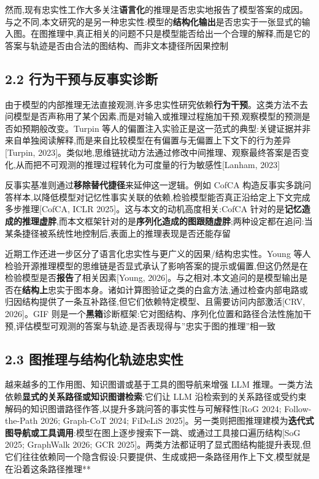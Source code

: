 \documentclass[
  11pt,
]{article}
\begin{document}
然而,现有忠实性工作大多关注\textbf{语言化}的推理是否忠实地报告了模型答案的成因。与之不同,本文研究的是另一种忠实性:模型的\textbf{结构化输出}是否忠实于一张显式的输入图。在图推理中,真正相关的问题不只是模型能否给出一个合理的解释,而是它的答案与轨迹是否由合法的图结构、而非文本捷径所因果控制

\subsection{2.2
行为干预与反事实诊断}\label{ux884cux4e3aux5e72ux9884ux4e0eux53cdux4e8bux5b9eux8bcaux65ad}

由于模型的内部推理无法直接观测,许多忠实性研究依赖\textbf{行为干预}。这类方法不去问模型是否声称用了某个因素,而是对输入或推理过程施加干预,观察模型的预测是否如预期般改变。Turpin
等人的偏置注入实验正是这一范式的典型:关键证据并非来自单独阅读解释,而是来自比较模型在有偏置与无偏置上下文下的行为差异{[}Turpin,
2023{]}。类似地,思维链扰动方法通过修改中间推理、观察最终答案是否变化,从而把不可观测的推理过程转化为可度量的行为敏感性{[}Lanham,
2023{]}

反事实基准则通过\textbf{移除替代捷径}来延伸这一逻辑。例如 CofCA
构造反事实多跳问答样本,以降低模型对记忆性事实关联的依赖,检验模型能否真正沿给定上下文完成多步推理{[}CofCA,
ICLR 2025{]}。这与本文的动机高度相关:CofCA
针对的是\textbf{记忆造成的推理虚胖},而本文框架针对的是\textbf{序列化造成的图跟随虚胖};两种设定都在追问:当某条捷径被系统性地控制后,表面上的推理表现是否还能存留

近期工作还进一步区分了语言化忠实性与更广义的因果/结构忠实性。Young
等人检验开源推理模型的思维链是否显式承认了影响答案的提示或偏置,但这仍然是在检验模型是否\textbf{报告}了相关因素{[}Young,
2026{]}。与之相对,本文追问的是模型输出是否在\textbf{结构上}忠实于图本身。诸如计算图验证之类的白盒方法,通过检查内部电路或归因结构提供了一条互补路径,但它们依赖特定模型、且需要访问内部激活{[}CRV,
2026{]}。GIF
则是一个\textbf{黑箱}诊断框架:它对图结构、序列化位置和路径合法性施加干预,评估模型可观测的答案与轨迹,是否表现得与''忠实于图的推理''相一致

\subsection{2.3
图推理与结构化轨迹忠实性}\label{ux56feux63a8ux7406ux4e0eux7ed3ux6784ux5316ux8f68ux8ff9ux5fe0ux5b9eux6027}

越来越多的工作用图、知识图谱或基于工具的图导航来增强 LLM
推理。一类方法依赖\textbf{显式的关系路径或知识图谱检索}:它们让 LLM
沿检索到的关系路径或受约束解码的知识图谱路径作答,以提升多跳问答的事实性与可解释性{[}RoG
2024; Follow-the-Path 2026; Graph-CoT 2024; FiDeLiS
2025{]}。另一类则把图推理建模为\textbf{迭代式图导航或工具调用}:模型在图上逐步搜索下一跳、或通过工具接口遍历结构{[}SoG
2025; GraphWalk 2026; GCR
2025{]}。两类方法都证明了显式图结构能提升表现,但它们往往依赖同一个隐含假设:只要提供、生成或把一条路径用作上下文,模型就是在沿着这条路径推理**
\end{document}
